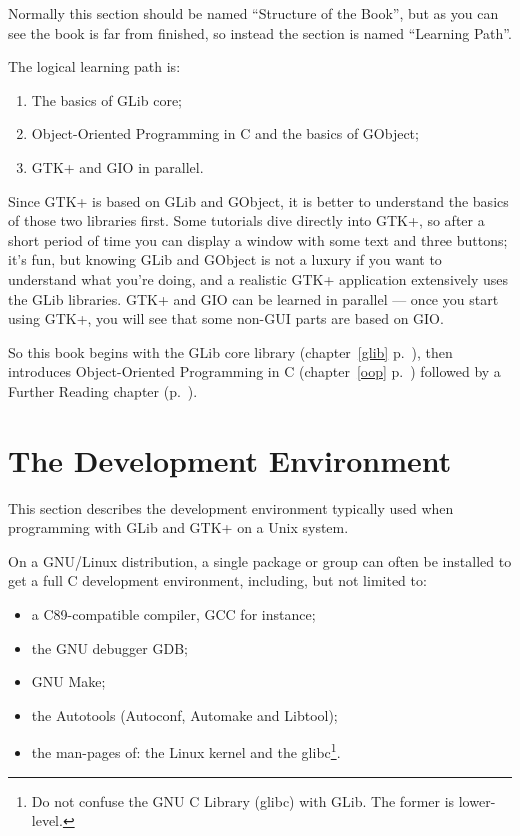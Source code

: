 Normally this section should be named ``Structure of the Book'', but as you can see the book is far from finished, so instead the section is named ``Learning Path''.

The logical learning path is:
\begin{enumerate}
  \item The basics of GLib core;
  \item Object-Oriented Programming in C and the basics of GObject;
  \item GTK+ and GIO in parallel.
\end{enumerate}

Since GTK+ is based on GLib and GObject, it is better to understand the basics of those two libraries first. Some tutorials dive directly into GTK+, so after a short period of time you can display a window with some text and three buttons; it's fun, but knowing GLib and GObject is not a luxury if you want to understand what you're doing, and a realistic GTK+ application extensively uses the GLib libraries. GTK+ and GIO can be learned in parallel --- once you start using GTK+, you will see that some non-GUI parts are based on GIO.

So this book begins with the GLib core library (chapter~\ref{glib} p.~\pageref{glib}), then introduces Object-Oriented Programming in C (chapter~\ref{oop} p.~\pageref{oop}) followed by a Further Reading chapter (p.~\pageref{further-reading}).

\section{The Development Environment}
\label{intro-dev-environment}

This section describes the development environment typically used when programming with GLib and GTK+ on a Unix system.

On a GNU/Linux distribution, a single package or group can often be installed to get a full C development environment, including, but not limited to:
\begin{itemize}
  \item a C89-compatible compiler, GCC for instance;
  \item the GNU debugger GDB;
  \item GNU Make;
  \item the Autotools (Autoconf, Automake and Libtool);
  \item the man-pages of: the Linux kernel and the glibc\footnote{Do not confuse the GNU C Library (glibc) with GLib. The former is lower-level.}.
\end{itemize}

